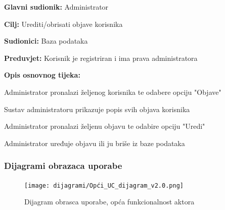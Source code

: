 \noindent {}
\begin{packed_item}
	\item \textbf{Glavni sudionik:} Administrator
	\item  \textbf{Cilj:} Urediti/obrisati objave korisnika
	\item  \textbf{Sudionici:} Baza podataka
	\item  \textbf{Preduvjet:} Korisnik je registriran i ima prava administratora
	\item  \textbf{Opis osnovnog tijeka:}
	
	\item[] \begin{packed_enum}
		
		\item Administrator pronalazi željenog korisnika te odabere opciju "Objave"
		\item Sustav administratoru prikazuje popis svih objava korisnika
		\item Administrator pronalazi željenu objavu te odabire opciju "Uredi"
		\item Administrator uređuje objavu ili ju briše iz baze podataka
	\end{packed_enum}
	
\end{packed_item}



					
				\subsubsection{Dijagrami obrazaca uporabe}
					
					\begin{figure}[H]
						\texttt{[image: dijagrami/Opći\_UC\_dijagram\_v2.0.png]} %
						\centering
						\caption{Dijagram obrasca uporabe, opća funkcionalnost aktora}
						\label{fig:promjene}
					\end{figure}
					
